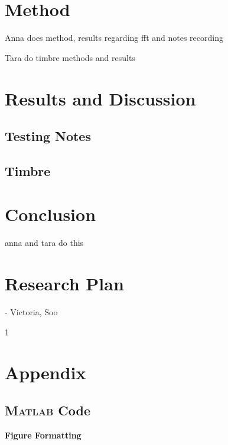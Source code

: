 \documentclass{article}
\begin{document}
\section{Method}
Anna does method, results regarding fft and notes recording

Tara do timbre methods and results

\section{Results and Discussion}
\subsection{Testing Notes}
\subsection{Timbre}

\section{Conclusion}
anna and tara do this

\section{Research Plan} - Victoria, Soo

\newpage
{}
\setcounter{page}1



\newpage
\section{Appendix}
\subsection{\textsc{Matlab} Code}

\noindent\textbf{Figure Formatting}


\end{document}
